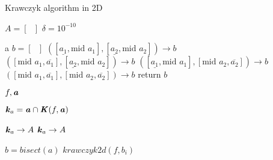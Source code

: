 \documentclass{article}
\begin{document}
\begin{algorithm}
\caption{Krawczyk algorithm in 2D}
\label{alg:Krawczyk2D}
\begin{algorithmic}
\State $A = [\text{ } ]$ 
\State $\delta = 10^{-10}$

 {a}
\State $b = [\text{ } ]$
\State $([\underline{a_1}, \text{mid } a_1], [\underline{a_2}, \text{mid } a_2]) \rightarrow b$
\State $([\text{mid } a_1, \overline{a_1}], [\underline{a_2}, \text{mid } a_2]) \rightarrow b$
\State $([\underline{a_1}, \text{mid } a_1], [\text{mid } a_2, \overline{a_2}]) \rightarrow b$
\State $([\text{mid } a_1, \overline{a_1}], [\text{mid } a_2, \overline{a_2}]) \rightarrow b$   
\State return $b$     
\EndFunction  



 {$f, \textbf{\emph{a}}$}

\State $\textbf{\emph{k}}_a = \textbf{\emph{a}} \cap \textbf{\emph{K}} (f, \textbf{\emph{a}})$


    
            
            \State {}
            \State $\textbf{\emph{k}}_a \rightarrow A$
        \Else
            \State {}
            \State $\textbf{\emph{k}}_a \rightarrow A$
        
        \EndIf
    \Else
        \State {}
        \State $b = bisect(a)$
        \State $krawczyk2d(f, b_i)$
        \EndFor

          
    
    \EndIf

\EndIf

\EndFunction
\end{algorithmic}
\end{algorithm}
\end{document}

